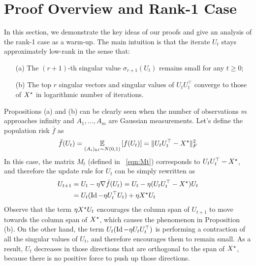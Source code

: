 \section{Proof Overview and Rank-1 Case}\label{sec:rank1}
\newcommand{\Pustar}{(\Id - \Id_{\vecgt})}

In this section, we demonstrate the key ideas of our proofs and give an analysis of the rank-1 case as a warm-up. 
The main intuition is that the iterate $U_t$ stays approximately low-rank in the sense that:
\begin{enumerate}
	\item[(a)] The $(r+1)$-th singular value $\sigma_{r+1}(U_t)$ \textup{remains small} for any $t\ge 0$;
	\item[(b)] The top $r$ singular vectors and singular values of $U_tU_t^\top$ converge to those of ${X}^\star$ in logarithmic number of iterations. 
\end{enumerate}
Propositions (a) and (b) can be clearly seen when the number of observations $m$ approaches infinity and $A_1,\dots, A_m$ are Gaussian measurements. Let's define the population risk $\bar{f}$ as 
\begin{align}\label{eq_test_error}
\bar{f}(U_t) = \operatorname*{\mathbb E}_{(A_i)_{k\ell} \sim N(0,1)}\left[f(U_t)\right] = \|U_tU_t^\top- {X}^\star\|_F^2
\end{align}
In this case, the matrix $M_t$ (defined in ~\eqref{eqn:Mt}) corresponds to $U_tU_t^\top - {X}^\star$, and therefore the update rule for $U_t$ can be simply rewritten as 
\begin{align*}
U_{t+1} & = U_t - \eta \nabla \bar{f}(U_t) = U_t - \eta(U_tU_t^\top - {X}^\star)U_t \\
& = U_t(\operatorname{Id} - \eta U_t^\top U_t)+ \eta {X}^\star U_t
\end{align*}
Observe that the term $\eta {X}^\star U_t$ encourages the column span of $U_{t+1}$ to move towards the column span of ${X}^\star$, which causes the phenomenon in Proposition (b). On the other hand, the term $U_t(\operatorname{Id} - \eta U_tU_t^\top)$ is performing a contraction of all the singular values of $U_t$, and therefore encourages them to remain small. 
As a result, $U_t$ decreases in those directions that are orthogonal to the span of ${X}^\star$, because there is no positive force to push up those directions.


